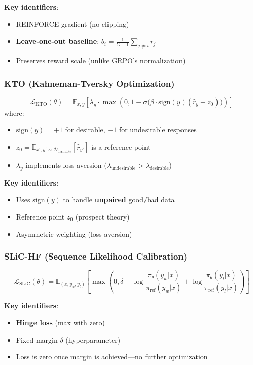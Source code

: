 \textbf{Key identifiers}:
\begin{itemize}
    \item REINFORCE gradient (no clipping)
    \item \textbf{Leave-one-out baseline}: $b_i = \frac{1}{G-1}\sum_{j \neq i} r_j$
    \item Preserves reward scale (unlike GRPO's normalization)
\end{itemize}

\subsubsection{KTO (Kahneman-Tversky Optimization)}
\[
    \mathcal{L}_{\text{KTO}}(\theta) = \mathbb{E}_{x,y} \left[ \lambda_y \cdot \max\left(0, 1 - \sigma\bigl(\beta \cdot \text{sign}(y)(\hat{r}_y - z_0)\bigr)\right) \right]
\]
where:
\begin{itemize}
    \item $\text{sign}(y) = +1$ for desirable, $-1$ for undesirable responses
    \item $z_0 = \mathbb{E}_{x', y' \sim \mathcal{D}_{\text{desirable}}}[\hat{r}_{y'}]$ is a reference point
    \item $\lambda_y$ implements loss aversion ($\lambda_{\text{undesirable}} > \lambda_{\text{desirable}}$)
\end{itemize}

\textbf{Key identifiers}:
\begin{itemize}
    \item Uses $\text{sign}(y)$ to handle \textbf{unpaired} good/bad data
    \item Reference point $z_0$ (prospect theory)
    \item Asymmetric weighting (loss aversion)
\end{itemize}

\subsubsection{SLiC-HF (Sequence Likelihood Calibration)}
\[
    \mathcal{L}_{\text{SLiC}}(\theta) = \mathbb{E}_{(x, y_w, y_l)} \left[ \max\left(0, \delta - \log \frac{\pi_\theta(y_w|x)}{\pi_{\text{ref}}(y_w|x)} + \log \frac{\pi_\theta(y_l|x)}{\pi_{\text{ref}}(y_l|x)} \right) \right]
\]

\textbf{Key identifiers}:
\begin{itemize}
    \item \textbf{Hinge loss} (max with zero)
    \item Fixed margin $\delta$ (hyperparameter)
    \item Loss is zero once margin is achieved---no further optimization
\end{itemize}


